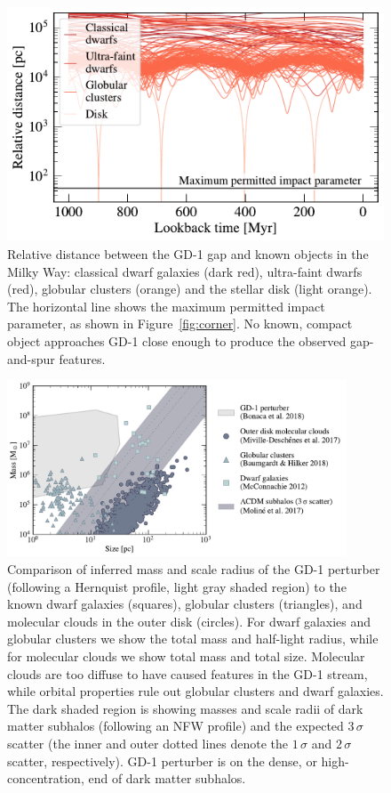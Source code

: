 \documentclass[twocolumn]{aastex62}
\begin{document}
\begin{figure}
\begin{center}
\includegraphics[width=\columnwidth]{satellite_distances.pdf}
\end{center}
\caption{Relative distance between the GD-1 gap and known objects in the Milky Way: classical dwarf galaxies (dark red), ultra-faint dwarfs (red), globular clusters (orange) and the stellar disk (light orange).
The horizontal line shows the maximum permitted impact parameter, as shown in Figure~\ref{fig:corner}.
No known, compact object approaches GD-1 close enough to produce the observed gap-and-spur features.
}
\label{fig:known_encounters}
\end{figure}

\begin{figure}
\begin{center}
\includegraphics[width=0.9\textwidth]{mass_size.pdf}
\end{center}
\caption{Comparison of inferred mass and scale radius of the GD-1 perturber (following a Hernquist profile, light gray shaded region) to the known dwarf galaxies (squares), globular clusters (triangles), and molecular clouds in the outer disk (circles).
For dwarf galaxies and globular clusters we show the total mass and half-light radius, while for molecular clouds we show total mass and total size.
Molecular clouds are too diffuse to have caused features in the GD-1 stream, while orbital properties rule out globular clusters and dwarf galaxies.
The dark shaded region is showing masses and scale radii of dark matter subhalos (following an NFW profile) and the expected $3\,\sigma$ scatter (the inner and outer dotted lines denote the $1\,\sigma$ and $2\,\sigma$ scatter, respectively).
GD-1 perturber is on the dense, or high-concentration, end of dark matter subhalos.
}
\label{fig:mass_size}
\end{figure}
\end{document}
